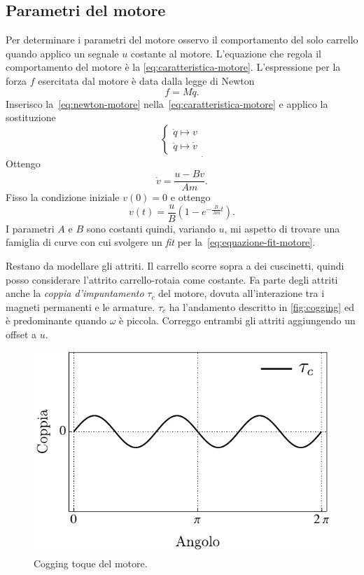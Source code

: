 \subsection{Parametri del motore}
\label{subsec:parametri-motore}
Per determinare i parametri del motore osservo il comportamento del solo
carrello quando applico un segnale $u$ costante al motore.
L'equazione che regola il comportamento del motore è la \eqref{eq:caratteristica-motore}.
L'espressione per la forza $f$
esercitata dal motore è data dalla legge di Newton
\begin{equation}
    f = M \ddot q.
    \label{eq:newton-motore}
\end{equation}
Inserisco la~\eqref{eq:newton-motore} nella~\eqref{eq:caratteristica-motore}
e applico la sostituzione
\begin{equation*}
    \left\{
    \begin{aligned}
        \dot q \mapsto v \\
        \ddot q \mapsto \dot v
    \end{aligned}
    \right.
    _.
    \label{eq:sostituzione-motore}
\end{equation*}
Ottengo
\begin{equation*}
    \dot v = \frac{u - B v} {Am}.
\end{equation*}
Fisso la condizione iniziale $v(0) = 0$ e ottengo
\begin{equation}
    v(t) = \frac u B \left(1 - e^{-\frac B {Am} t}\right).
    \label{eq:equazione-fit-motore}
\end{equation}
I parametri $A$ e $B$ sono costanti quindi, variando $u$, mi aspetto di trovare
una famiglia di curve con cui svolgere un \emph{fit} per la~\eqref{eq:equazione-fit-motore}.

Restano da modellare gli attriti.
Il carrello scorre sopra a dei cuscinetti,
quindi posso considerare l'attrito carrello-rotaia come costante.
Fa parte degli attriti anche la \emph{coppia d'impuntamento} $\tau_c$ del motore,
dovuta all'interazione tra i magneti permanenti e le armature. $\tau_c$ ha
l'andamento descritto in \autoref{fig:cogging} ed è predominante quando $\omega$ è
piccola.
Correggo entrambi gli attriti aggiungendo un offset a $u$.



\begin{figure}[H]
    \centering
    \includegraphics{assets/cogging-torque}
    \caption[Cogging torque]{Cogging toque del motore.}
    \label{fig:cogging}
\end{figure}
